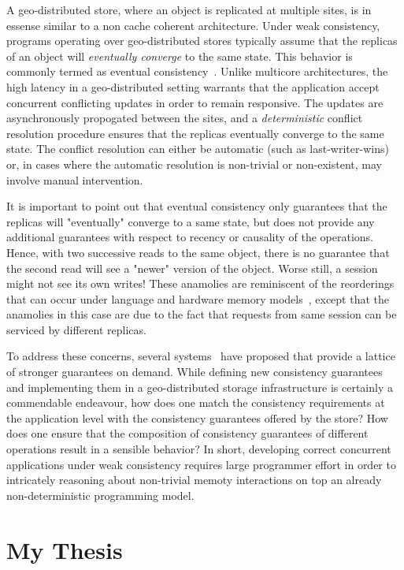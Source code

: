 A geo-distributed store, where an object is replicated at multiple sites, is in
essense similar to a non cache coherent architecture. Under weak consistency,
programs operating over geo-distributed stores typically assume that the
replicas of an object will \emph{eventually converge} to the same state. This
behavior is commonly termed as eventual
consistency~\cite{Terry1995,Bailis2013}. Unlike multicore architectures, the
high latency in a geo-distributed setting warrants that the application accept
concurrent conflicting updates in order to remain responsive. The updates are
asynchronously propogated between the sites, and a \emph{deterministic}
conflict resolution procedure ensures that the replicas eventually converge to
the same state. The conflict resolution can either be automatic (such as
last-writer-wins) or, in cases where the automatic resolution is non-trivial or
non-existent, may involve manual intervention.

It is important to point out that eventual consistency only guarantees that the
replicas will "eventually" converge to a same state, but does not provide any
additional guarantees with respect to recency or causality of the operations.
Hence, with two successive reads to the same object, there is no guarantee that
the second read will see a "newer" version of the object. Worse still, a
session might not see its own writes! These anamolies are reminiscent of the
reorderings that can occur under language and hardware memory
models~\cite{Demange2013,Sewell2010}, except that the anamolies in this case
are due to the fact that requests from same session can be serviced by
different replicas.

To address these concerns, several systems~\cite{COPS, Eiger, Walter, Li2012,
HAT} have proposed that provide a lattice of stronger guarantees on demand.
While defining new consistency guarantees and implementing them in a
geo-distributed storage infrastructure is certainly a commendable endeavour,
how does one match the consistency requirements at the application level with
the consistency guarantees offered by the store? How does one ensure that the
composition of consistency guarantees of different operations result in a
sensible behavior? In short, developing correct concurrent applications under
weak consistency requires large programmer effort in order to intricately
reasoning about non-trivial memoty interactions on top an already
non-deterministic programming model.

\section{My Thesis}

